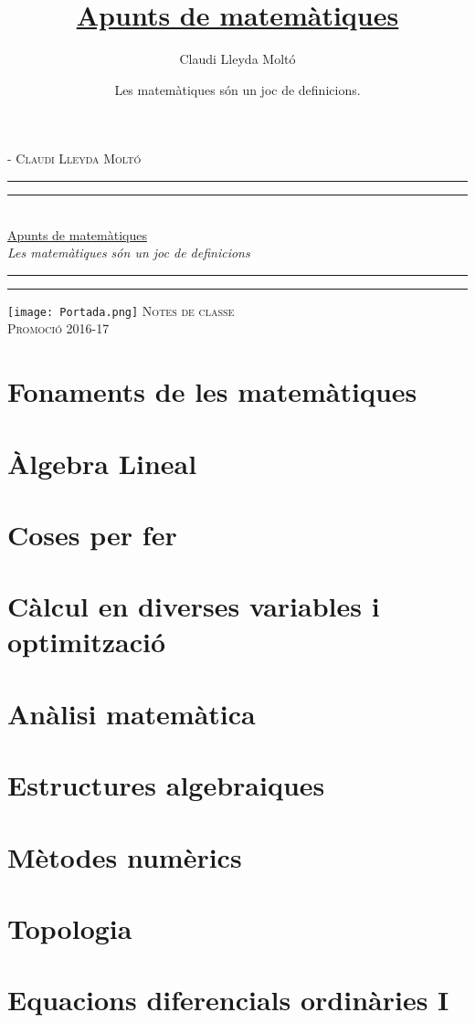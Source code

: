 \documentclass[10pt, a4paper, openright]{memoir}
\title{%
	\href{https://claudilleyda.github.io}{Apunts de matemàtiques}}
\author{Claudi Lleyda Moltó}
\date{Les matemàtiques són un joc de definicions.}
\theoremstyle{plain}
\theoremstyle{definition}
\newcommand*{\titleTMB}{\begingroup%
	\vspace*{0.1\textheight}
	\centering
	\settowidth{\unitlength}{\itshape Les matemàtiques són un joc de definicions}
	\vspace*{\baselineskip}
	{\large\scshape Claudi Lleyda Moltó}\\[\baselineskip]
	\rule{\unitlength}{1.6pt}\vspace*{-\baselineskip}\vspace*{2pt}
	\rule{\unitlength}{0.4pt}\\[\baselineskip]
	{\LARGE \href{https://claudilleyda.github.io}{Apunts de matemàtiques}}\\[\baselineskip] %
	{\itshape Les matemàtiques són un joc de definicions}\\[0.2\baselineskip]
	\rule{\unitlength}{0.4pt}\vspace*{-\baselineskip}\vspace{3.2pt}
	\rule{\unitlength}{1.6pt}%
	\vfill
	{\centering\texttt{[image: Portada.png]}}
	\vfill
	{\large\scshape Notes de classe}\\[\baselineskip]
	{\small\scshape Promoció 2016-17}\par
	\vspace*{0.1\textheight}
	\endgroup}
\let\originalpart=\part
\def\part{\cleartoevenpage[\thispagestyle{empty}]\originalpart}
\begin{document}
	{\hypersetup{urlcolor=black,linkcolor=black}
	\begin{titlingpage*}
		\calccentering{\unitlength}
		\begin{adjustwidth*}{\unitlength}{-\unitlength}
			\titleTMB
		\end{adjustwidth*}
	\end{titlingpage*}
	\tableofcontents}
	\part{Fonaments de les matemàtiques}
		
	\part{Àlgebra Lineal}
		
	\part{Coses per fer}
		
	\part{Càlcul en diverses variables i optimització}
		
	\part{Anàlisi matemàtica}
		
	\part{Estructures algebraiques}
		
	\part{Mètodes numèrics}
		
	\part{Topologia}
		
	\part{Equacions diferencials ordinàries I}
		
\end{document}
